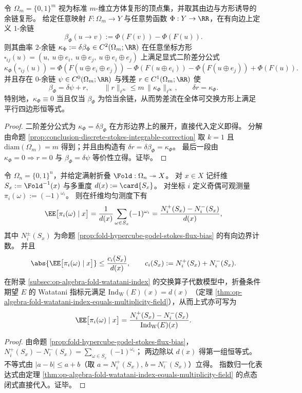 \begin{proposition}[超立方体势差流的曲率闭式与受控严格化分解]\label{prop:discussion-hypercube-potential-curvature-controlled-strictification}
令 \(\Omega_m=\{0,1\}^m\) 视为标准 \(m\)-维立方体复形的顶点集，并取其由边与方形诱导的余链复形。
给定任意映射 \(F:\Omega_m\to Y\) 与任意势函数 \(\Phi:Y\to\RR\)，在有向边上定义 \(1\)-余链
\[
\beta_\Phi(u\to v):=\Phi(F(v))-\Phi(F(u)).
\]
则其曲率 \(2\)-余链 \(\kappa_\Phi:=\delta\beta_\Phi\in C^2(\Omega_m;\RR)\) 在任意坐标方形
\(
\square_{ij}(u)=(u,\ u\oplus e_i,\ u\oplus e_j,\ u\oplus e_i\oplus e_j)
\)
上满足显式二阶差分公式
\[
\kappa_\Phi(\square_{ij}(u))
=
\Phi(F(u\oplus e_i\oplus e_j))-\Phi(F(u\oplus e_i))-\Phi(F(u\oplus e_j))+\Phi(F(u)).
\]
并且存在 \(0\)-余链 \(\psi\in C^0(\Omega_m;\RR)\) 与残差 \(r\in C^1(\Omega_m;\RR)\) 使
\[
\beta_\Phi=\delta\psi+r,
\qquad
\|r\|_{\ell^\infty}\le m\,\|\kappa_\Phi\|_{\ell^\infty},
\qquad
\delta r=\kappa_\Phi.
\]
特别地，\(\kappa_\Phi\equiv 0\) 当且仅当 \(\beta_\Phi\) 为恰当余链，从而势差流在全体可交换方形上满足平行四边形恒等式。
\end{proposition}
\begin{proof}
二阶差分公式为 \(\kappa_\Phi=\delta\beta_\Phi\) 在方形边界上的展开，直接代入定义即得。
分解由命题 \ref{prop:conclusion-discrete-stokes-integrable-correction} 取 \(k=1\) 且 \(\mathrm{diam}(\Omega_m)=m\) 得到；并且由构造有 \(\delta r=\delta\beta_\Phi=\kappa_\Phi\)。
最后一段由 \(\kappa_\Phi=0\Rightarrow r=0\) 与 \(\beta_\Phi=\delta\psi\) 等价性立得。证毕。
\end{proof}

\begin{proposition}\label{prop:discussion-fiber-stokes-watatani-normalization}
令 \(\Omega_n=\{0,1\}^n\)，并给定满射折叠 \(\Fold:\Omega_n\twoheadrightarrow X\)。
对 \(x\in X\) 记纤维 \(S_x:=\Fold^{-1}(x)\) 与多重度 \(d(x):=\card{S_x}\)。
对坐标 \(i\) 定义奇偶可观测量 \(\pi_i(\omega):=(-1)^{\omega_i}\)。
则在纤维均匀测度下有
\[
\EE\bigl[\pi_i(\omega)\mid x\bigr]
=\frac1{d(x)}\sum_{\omega\in S_x}(-1)^{\omega_i}
=\frac{N_i^+(S_x)-N_i^-(S_x)}{d(x)},
\]
其中 \(N_i^\pm(S_x)\) 为命题 \ref{prop:fold-hypercube-godel-stokes-flux-bias} 的有向边界计数。
并且
\[
\abs{\EE\bigl[\pi_i(\omega)\mid x\bigr]}
\le \frac{c_i(S_x)}{d(x)},
\qquad c_i(S_x):=N_i^+(S_x)+N_i^-(S_x).
\]
在附录 \ref{subsec:op-algebra-fold-watatani-index} 的交换算子代数模型中，折叠条件期望 \(E\) 的 Watatani 指标元满足
\(
\mathrm{Ind}_{\mathrm W}(E)(x)=d(x)
\)
（定理 \ref{thm:op-algebra-fold-watatani-index-equals-multiplicity-field}），从而上式亦可写为
\[
\EE\bigl[\pi_i(\omega)\mid x\bigr]
=\frac{N_i^+(S_x)-N_i^-(S_x)}{\mathrm{Ind}_{\mathrm W}(E)(x)}.
\]
\end{proposition}
\begin{proof}
由命题 \ref{prop:fold-hypercube-godel-stokes-flux-bias}，
\(
N_i^+(S_x)-N_i^-(S_x)=\sum_{\omega\in S_x}(-1)^{\omega_i}
\)；
两边除以 \(d(x)\) 得第一组恒等式。
不等式由 \(|a-b|\le a+b\)（取 \(a=N_i^+(S_x)\), \(b=N_i^-(S_x)\)）立得。
指数归一化表达式由定理 \ref{thm:op-algebra-fold-watatani-index-equals-multiplicity-field} 的点态闭式直接代入。证毕。
\end{proof}

